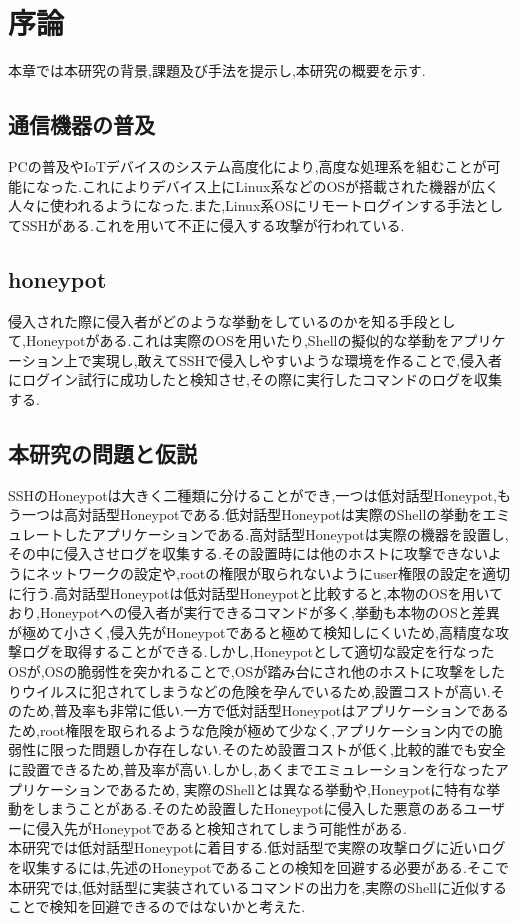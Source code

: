 \chapter{序論}
\label{intr}

本章では本研究の背景,課題及び手法を提示し,本研究の概要を示す.

\section{通信機器の普及}
\label{intr:back}
PCの普及やIoTデバイスのシステム高度化により,高度な処理系を組むことが可能になった.これによりデバイス上にLinux系などのOSが搭載された機器が広く人々に使われるようになった.また,Linux系OSにリモートログインする手法としてSSHがある.これを用いて不正に侵入する攻撃が行われている.

\section{honeypot}
\label{intr:honey}
 侵入された際に侵入者がどのような挙動をしているのかを知る手段として,Honeypotがある.これは実際のOSを用いたり,Shellの擬似的な挙動をアプリケーション上で実現し,敢えてSSHで侵入しやすいような環境を作ることで,侵入者にログイン試行に成功したと検知させ,その際に実行したコマンドのログを収集する.

\section{本研究の問題と仮説}
\label{intr:prob}
SSHのHoneypotは大きく二種類に分けることができ,一つは低対話型Honeypot,もう一つは高対話型Honeypotである.低対話型Honeypotは実際のShellの挙動をエミュレートしたアプリケーションである.高対話型Honeypotは実際の機器を設置し,その中に侵入させログを収集する.その設置時には 他のホストに攻撃できないようにネットワークの設定や,rootの権限が取られないようにuser権限の設定を適切に行う.高対話型Honeypotは低対話型Honeypotと比較すると,本物のOSを用いており,Honeypotへの侵入者が実行できるコマンドが多く,挙動も本物のOSと差異が極めて小さく,侵入先がHoneypotであると極めて検知しにくいため,高精度な攻撃ログを取得することができる.しかし,Honeypotとして適切な設定を行なったOSが,OSの脆弱性を突かれることで,OSが踏み台にされ他のホストに攻撃をしたりウイルスに犯されてしまうなどの危険を孕んでいるため,設置コストが高い.そのため,普及率も非常に低い\cite{HighIntHoney}.一方で低対話型Honeypotはアプリケーションであるため,root権限を取られるような危険が極めて少なく,アプリケーション内での脆弱性に限った問題しか存在しない.そのため設置コストが低く,比較的誰でも安全に設置できるため,普及率が高い.しかし,あくまでエミュレーションを行なったアプリケーションであるため,実際のShellとは異なる挙動や,Honeypotに特有な挙動をしまうことがある.そのため 設置したHoneypotに侵入した悪意のあるユーザーに侵入先がHoneypotであると検知されてしまう可能性がある.\\
 本研究では低対話型Honeypotに着目する.低対話型で実際の攻撃ログに近いログを収集するには,先述のHoneypotであることの検知を回避する必要がある.そこで本研究では,低対話型に実装されているコマンドの出力を,実際のShellに近似することで検知を回避できるのではないかと考えた. 

